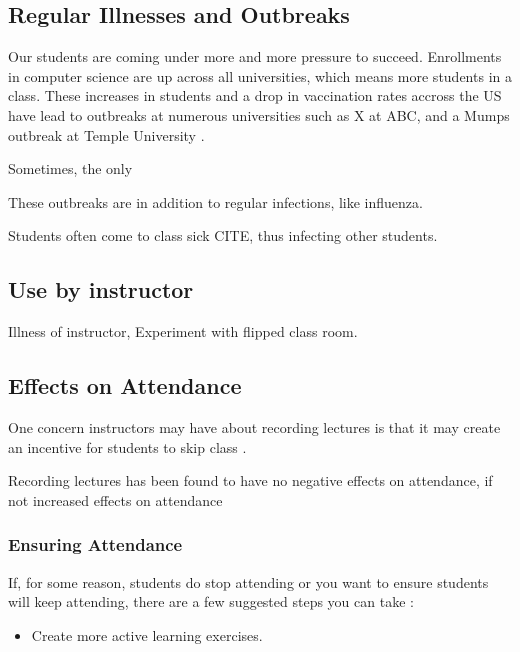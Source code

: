 \documentclass[sigconf]{acmart}
\begin{document}
\subsection{Regular Illnesses and Outbreaks}
Our students are coming under more and more pressure to succeed.  
Enrollments in computer science are up across all universities, which means more students in a class. 
These increases in students and a drop in vaccination rates accross the US have lead to outbreaks at numerous universities such as X at ABC, and a Mumps outbreak at Temple University \cite{emezienna2019resurgence}.

Sometimes, the only 

These outbreaks are in addition to regular infections, like influenza. 

Students often come to class sick CITE, thus infecting other students.




\subsection{Use by instructor}
Illness of instructor, 
Experiment with flipped class room.


\subsection{Effects on Attendance}
One concern instructors may have about recording lectures is that it may create an incentive for students to skip class \cite{larkin2010but}.




Recording lectures has been found to have no negative effects on attendance, if not increased effects on attendance \cite{shimoff2001effects}

\subsubsection{Ensuring Attendance}
If, for some reason, students do stop attending or you want to ensure students will keep attending, there are a few suggested steps you can take \cite{larkin2010but}:
\begin{itemize}
	\item Create more active learning exercises.
\end{itemize}
\end{document}
